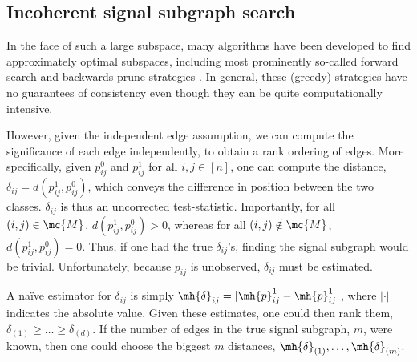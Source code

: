 

\subsection{Incoherent signal subgraph search} %
\label{ssub:classifier_free_signal_subgraph_searches}

In the face of such a large subspace, many algorithms have been developed to find approximately optimal subspaces, including most prominently so-called forward search and backwards prune strategies \cite{LiuYu05}.  In general, these (greedy) strategies have no guarantees of consistency even though they can be quite computationally intensive.  

However, given the independent edge assumption, we can compute the significance of each edge independently, to obtain a rank ordering of edges.  More specifically, given $p^0_{ij}$ and $p^1_{ij}$ for all $i,j \in [n]$, one can compute the distance, $\delta_{ij}=d(p^1_{ij},p^0_{ij})$, which conveys the difference in position between the two classes.  $\delta_{ij}$ is thus an uncorrected test-statistic. Importantly, for all $(i,j) \in \mc{M}$, $d(p_{ij}^1,p_{ij}^0)>0$, whereas for all $(i,j) \notin \mc{M}$, $d(p_{ij}^1,p_{ij}^0)=0$.   Thus, if one had the true $\delta_{ij}$'s, finding the signal subgraph would be trivial.  Unfortunately, because $p_{ij}$ is unobserved, $\delta_{ij}$ must be estimated.  

A na\"{i}ve estimator for $\delta_{ij}$ is simply $\mh{\delta}_{ij}=|\mh{p}_{ij}^1-\mh{p}_{ij}^1|$, where $|\cdot|$ indicates the absolute value.  Given these estimates, one could then rank them,  $\delta_{(1)}\geq  \ldots \geq \delta_{(d)}$.  If the number of edges in the true signal subgraph, $m$, were known, then one could choose the biggest $m$ distances, $\mh{\delta}_{(1)}, \ldots, \mh{\delta}_{(m)}$.

